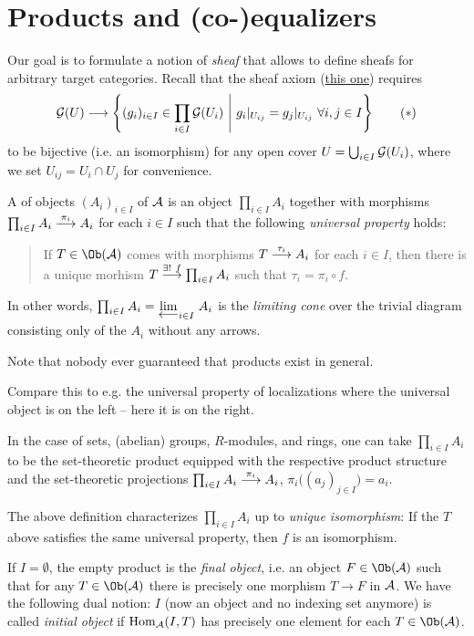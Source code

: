 \documentclass[a4paper,parskip=half,numbers=enddot, DIV=12]{scrreprt}
\begin{document}
  \section{Products and (co-)equalizers}
  Our goal is to formulate a notion of \emph{sheaf} that allows to define sheafs for arbitrary target categories. Recall that the sheaf axiom (\hyperref[sheafAxiom]{this one}) requires
  \begin{align}\lbl{eq:sheafAxiom}
  	\Gg(U)\longrightarrow\left\{(g_i)_{i\in I}\in\prod_{i\in I}\Gg(U_i)\st g_i|_{U_{ij}}=g_j|_{U_{ij}}\ \forall i,j\in I\right\}\tag{$*$}
  \end{align}
  to be bijective (i.e. an isomorphism) for any open cover $U=\bigcup_{i\in I}\mathcal{G}(U_i)$, where we set $U_{ij}=U_i\cap U_j$ for convenience.
  
  \begin{defi}[Products]
  	A  of objects $(A_i)_{i\in I}$ of $\mathcal{A}$ is an object $\prod_{i\in I}A_i$ together with morphisms $\prod_{i\in I}A_i\morphism[\pi_i]A_i$ for each $i\in I$ such that the following \emph{universal property} holds:
  	\begin{quote}
  		If $T\in\Ob(\Aa)$ comes with morphisms $T\morphism[\tau_i]A_i$ for each $i\in I$, then there is a unique morhism $T\morphism[\exists!\ f]\prod_{i\in I}A_i$ such that $\tau_i=\pi_i\circ f$.
  	\end{quote}
  	In other words, $\prod_{i\in I}A_i=\limit[i\in I]{A_i}$ is the \emph{limiting cone} over the trivial diagram consisting only of the $A_i$ without any arrows.
  \end{defi}
  Note that nobody ever guaranteed that products exist in general.
  \begin{rem*}
  	\begin{alphanumerate}
  		\item Compare this to e.g. the universal property of localizations where the universal object is on the left -- here it is on the right.
  		\item In the case of sets, (abelian) groups, $R$-modules, and rings, one can take $\prod_{i\in I}A_i$ to be the set-theoretic product equipped with the respective product structure and the set-theoretic projections $\prod_{i\in I}A_i\morphism[\pi_i]A_i$, $\pi_i\big((a_j)_{j\in I}\big)=a_i$.
  		\item The above definition characterizes $\prod_{i\in I}A_i$ up to \emph{unique isomorphism}: If the $T$ above satisfies the same universal property, then $f$ is an isomorphism.
  		\item If $I=\emptyset$, the empty product is the \emph{final object}, i.e. an object $F\in\Ob(\Aa)$ such that for any $T\in\Ob(\Aa)$ there is precisely one morphism $T\to F$ in $\mathcal{A}$. We have the following dual notion: $I$ (now an object and no indexing set anymore) is called \emph{initial object} if $\operatorname{Hom}_{\mathcal{A}}(I,T)$ has precisely one element for each $T\in\Ob(\Aa)$.
  	\end{alphanumerate}
  \end{rem*}
\end{document}
